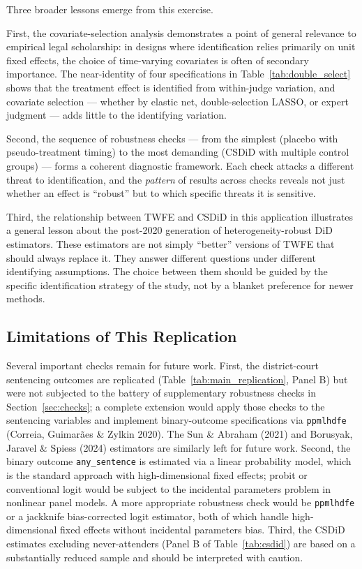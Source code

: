 \documentclass[12pt,a4paper]{article}
\begin{document}
Three broader lessons emerge from this exercise.

First, the covariate-selection analysis demonstrates a point of general relevance to empirical legal scholarship: in designs where identification relies primarily on unit fixed effects, the choice of time-varying covariates is often of secondary importance. The near-identity of four specifications in Table~\ref{tab:double_select} shows that the treatment effect is identified from within-judge variation, and covariate selection --- whether by elastic net, double-selection LASSO, or expert judgment --- adds little to the identifying variation.

Second, the sequence of robustness checks --- from the simplest (placebo with pseudo-treatment timing) to the most demanding (CSDiD with multiple control groups) --- forms a coherent diagnostic framework. Each check attacks a different threat to identification, and the \emph{pattern} of results across checks reveals not just whether an effect is ``robust'' but to which specific threats it is sensitive.

Third, the relationship between TWFE and CSDiD in this application illustrates a general lesson about the post-2020 generation of heterogeneity-robust DiD estimators. These estimators are not simply ``better'' versions of TWFE that should always replace it. They answer different questions under different identifying assumptions. The choice between them should be guided by the specific identification strategy of the study, not by a blanket preference for newer methods.

\subsection{Limitations of This Replication}

Several important checks remain for future work. First, the district-court sentencing outcomes are replicated (Table~\ref{tab:main_replication}, Panel B) but were not subjected to the battery of supplementary robustness checks in Section~\ref{sec:checks}; a complete extension would apply those checks to the sentencing variables and implement binary-outcome specifications via \texttt{ppmlhdfe} (Correia, Guimar\~aes \& Zylkin 2020). The Sun \& Abraham (2021) and Borusyak, Jaravel \& Spiess (2024) estimators are similarly left for future work. Second, the binary outcome \texttt{any\_sentence} is estimated via a linear probability model, which is the standard approach with high-dimensional fixed effects; probit or conventional logit would be subject to the incidental parameters problem in nonlinear panel models. A more appropriate robustness check would be \texttt{ppmlhdfe} or a jackknife bias-corrected logit estimator, both of which handle high-dimensional fixed effects without incidental parameters bias. Third, the CSDiD estimates excluding never-attenders (Panel B of Table~\ref{tab:csdid}) are based on a substantially reduced sample and should be interpreted with caution.
\end{document}
